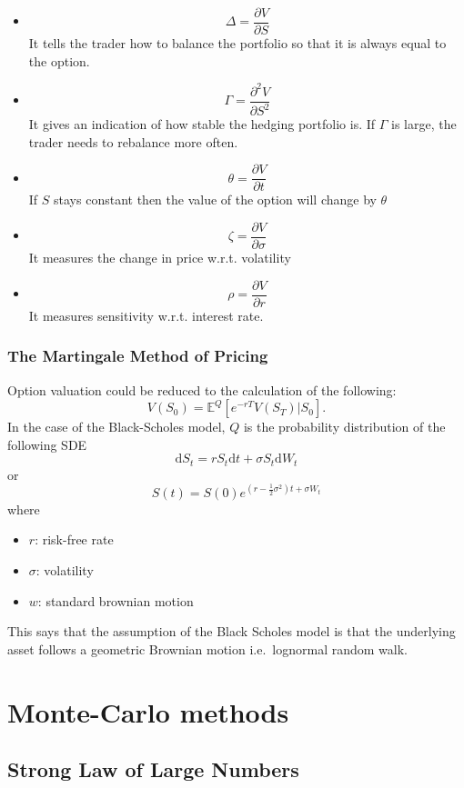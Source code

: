 \documentclass[twocolumn,landscape,10pt]{article}
\theoremstyle{definition}
\begin{document}
\begin{itemize}
    \item 
        \[
            \Delta=\frac{\partial V}{\partial S}
        \]
        It tells the trader how to balance the portfolio so that it is always
        equal to the option.
    \item 
        \[
            \Gamma=\frac{\partial^2 V}{\partial S^2}
        \]
        It gives an indication of how stable the hedging portfolio is. If
        $\Gamma$ is large, the trader needs to rebalance more often.
    \item
        \[
            \theta=\frac{\partial V}{\partial t}
        \]
        If $S$ stays constant then the value of the option will change by
        $\theta$
    \item
        \[
            \zeta=\frac{\partial V}{\partial \sigma}
        \]
        It measures the change in price w.r.t. volatility
    \item
        \[
            \rho=\frac{\partial V}{\partial r}
        \]
        It measures sensitivity w.r.t. interest rate.
\end{itemize}

\subsubsection{The Martingale Method of Pricing}

Option valuation could be reduced to the calculation of the following:
\[
    V(S_0)=\mathbb{E}^{Q}\left[e^{-rT}V(S_T)|S_0\right].
\]
In the case of the Black-Scholes model, $Q$ is the probability distribution of
the following SDE
\[
    \mathrm{d}S_t=rS_t\mathrm{d}t+\sigma S_t\mathrm{d}W_t
\]
or
\[
    S(t)=S(0)e^{\left(r-\frac{1}{2}\sigma^2\right)t+\sigma W_t}
\]
where
\begin{itemize}
    \item $r$: risk-free rate
    \item $\sigma$: volatility
    \item $w$: standard brownian motion
\end{itemize}
This says that the assumption of the Black Scholes model is that the underlying
asset follows a geometric Brownian motion i.e.\ lognormal random walk.


\section{Monte-Carlo methods}

\subsection{Strong Law of Large Numbers}
\end{document}
